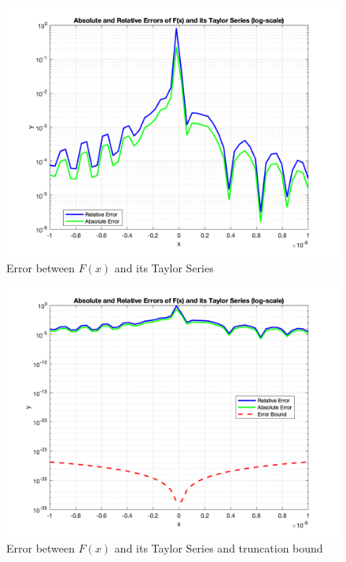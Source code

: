 \documentclass[letter,11pt]{article}
\begin{document}
\begin{figure}[h]
  \centering
  \includegraphics[width=0.8\linewidth]{lab1b_3_error.png}
  \caption{Error between $F(x)$ and its Taylor Series}
  \label{fig:lab1b_3_error}
\end{figure}

\begin{figure}[h]
  \centering
  \includegraphics[width=0.8\linewidth]{lab1b_3_error_bound.png}
  \caption{Error between $F(x)$ and its Taylor Series and truncation bound}
  \label{fig:lab1b_3_error_bound}
\end{figure}
\end{document}
